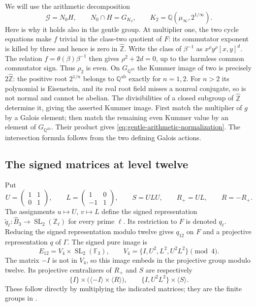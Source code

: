 We will use the arithmetic decomposition
\begin{equation}
 \mathcal G=N_0H,\qquad
 N_0\cap H=G_{K_2},\qquad
 K_2=\mathbb Q(\mu_\infty,2^{1/\infty}).
 \label{eq:gentle-arithmetic-normalization}
\end{equation}
Here is why it holds also in the gentle group. At multiplier one,
the two cycle equations make $f$ trivial in the class-two quotient
of $F$: its commutator exponent is killed by three and hence is zero
in $\widehat{\mathbb Z}$. Write the class of $\beta^{-1}$ as
$x^\rho y^\rho[x,y]^d$. The relation
$f=\theta(\beta)\beta^{-1}$ then gives
$\rho^2+2d=0$, up to the harmless common commutator sign. Thus
$\rho_2$ is even. On $G_{\mathbb Q^{\mathrm{ab}}}$ the Kummer
image of two is precisely $2\widehat{\mathbb Z}$: the positive root
$2^{1/n}$ belongs to $\mathbb Q^{\mathrm{ab}}$ exactly for $n=1,2$.
For $n>2$ its polynomial is Eisenstein, and its real root field
misses a nonreal conjugate, so is not normal and cannot be abelian.
The divisibilities of a closed subgroup of $\widehat{\mathbb Z}$
determine it, giving the asserted Kummer image.
First match the multiplier of $g$ by a Galois element; then match
the remaining even Kummer value by an element of
$G_{\mathbb Q^{\mathrm{ab}}}$. Their product gives
\eqref{eq:gentle-arithmetic-normalization}. The intersection formula
follows from the two defining Galois actions.

\subsection{The signed matrices at level twelve}

Put
\[
 U=\begin{pmatrix}1&1\\0&1\end{pmatrix},\qquad
 L=\begin{pmatrix}1&0\\-1&1\end{pmatrix},\qquad
 S=ULU,\qquad R_+=UL,\qquad R=-R_+.
\]
The assignments $u\mapsto U$, $v\mapsto L$ define the signed
representation $\widetilde q_\ell:\widehat B_3\to
\operatorname{SL}_2(\mathbb Z_\ell)$ for every prime $\ell$.
Its restriction to $F$ is denoted $q_\ell$. Reducing the signed
representation modulo twelve gives $q_{12}$ on $F$ and a projective
representation $q$ of $\Gamma$.
The signed pure image is
\[
 E_{12}=V_4\times\operatorname{SL}_2(\mathbb F_3),
 \qquad V_4=\{I,U^2,L^2,U^2L^2\}\pmod4.
\]
The matrix $-I$ is not in $V_4$, so this image embeds in the
projective group modulo twelve. Its projective centralizers of
$R_+$ and $S$ are respectively
\begin{equation}
 \{I\}\times\bigl(\langle-I\rangle\times\langle R\rangle\bigr),
 \qquad
 \{I,U^2L^2\}\times\langle S\rangle.
 \label{eq:finite-frame-centralizers}
\end{equation}
These follow directly by multiplying the indicated matrices; they
are the finite groups in \cite[Lemma~12]{H17}.

